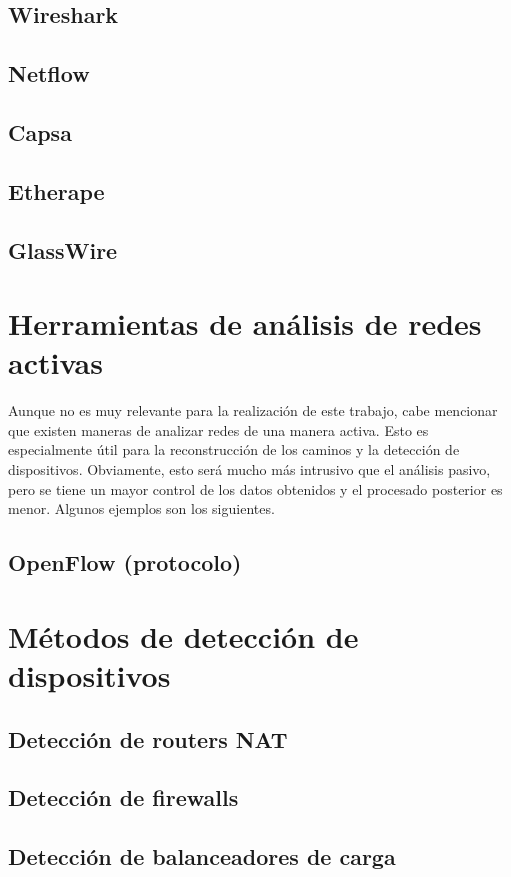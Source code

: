 \documentclass[twoside, 12pt]{epstfg}
\begin{document}
\subsection{Wireshark}
\subsection{Netflow}
\subsection{Capsa}
\subsection{Etherape}
\subsection{GlassWire}

\section{Herramientas de análisis de redes activas}
Aunque no es muy relevante para la realización de este trabajo, cabe mencionar que existen maneras de analizar redes de una manera activa. Esto es especialmente útil para la reconstrucción de los caminos y la detección de dispositivos. Obviamente, esto será mucho más intrusivo que el análisis pasivo, pero se tiene un mayor control de los datos obtenidos y el procesado posterior es menor. Algunos ejemplos son los siguientes.

\subsection{OpenFlow (protocolo)}

\section{Métodos de detección de dispositivos}
\subsection{Detección de routers NAT}
\cite{Krmicek}
\subsection{Detección de firewalls}
\subsection{Detección de balanceadores de carga}
\end{document}
